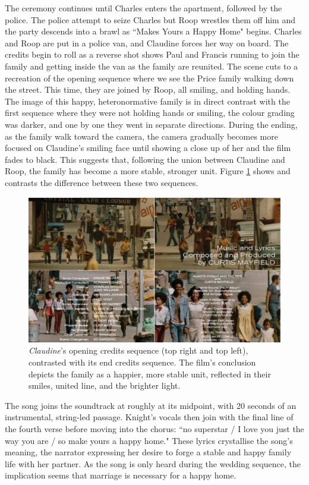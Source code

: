The ceremony continues until Charles enters the apartment, followed by the police.
The police attempt to seize Charles but Roop wrestles them off him and the party descends into a brawl as ``Makes Yours a Happy Home" begins.
Charles and Roop are put in a police van, and Claudine forces her way on board.
The credits begin to roll as a reverse shot shows Paul and Francis running to join the family and getting inside the van as the family are reunited.
The scene cuts to a recreation of the opening sequence where we see the Price family walking down the street.
This time, they are joined by Roop, all smiling, and holding hands.
The image of this happy, heteronormative family is in direct contrast with the first sequence where they were not holding hands or smiling, the colour grading was darker, and one by one they went in separate directions.
During the ending, as the family walk toward the camera, the camera gradually becomes more focused on Claudine's smiling face until showing a close up of her and the film fades to black.
This suggests that, following the union between Claudine and Roop, the family has become a more stable, stronger unit.
Figure \ref{fig:claudine-ending-opening} shows and contrasts the difference between these two sequences.

\begin{figure}
    \centering
    \includegraphics[width=1\linewidth]{img/claudine-ending-opening.pdf}
    \caption{\textit{Claudine}'s opening credits sequence (top right and top left), contrasted with its end credits sequence. The film's conclusion depicts the family as a happier, more stable unit, reflected in their smiles, united line, and the brighter light.}
    \label{fig:claudine-ending-opening}
\end{figure}

The song joins the soundtrack at roughly at its midpoint, with 20 seconds of an instrumental, string-led passage.
Knight's vocals then join with the final line of the fourth verse before moving into the chorus: ``no superstar / I love you just the way you are / so make yours a happy home."
These lyrics crystallise the song's meaning, the narrator expressing her desire to forge a stable and happy family life with her partner.
As the song is only heard during the wedding sequence, the implication seems that marriage is necessary for a happy home.

